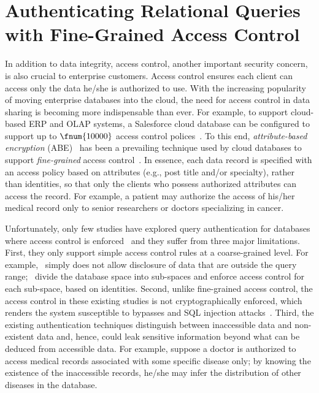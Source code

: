 \section{Authenticating Relational Queries with Fine-Grained Access Control}

In addition to data integrity, access control, another important security concern, is also crucial to enterprise customers. Access control ensures each client can access only the data he/she is authorized to use. With the increasing popularity of moving enterprise databases into the cloud, the need for access control in data sharing is becoming more indispensable than ever. For example, to support cloud-based ERP and OLAP systems, a Salesforce cloud database can be configured to support up to $\fnum{10000}$ access control polices~\cite{salesforce}. To this end, \emph{attribute-based encryption} (ABE)~\cite{10.1145/1180405.1180418,10.1109/sp.2007.11} has been a prevailing technique used by cloud databases to support \emph{fine-grained} access control~\cite{10.1145/2699026.2699101,10.1007/978-3-662-43936-4_21,10.1007/s10916-016-0588-0}. In essence, each data record is specified with an access policy based on attributes (e.g., post title and/or specialty), rather than identities, so that only the clients who possess authorized attributes can access the record. For example, a patient may authorize the access of his/her medical record only to senior researchers or doctors specializing in cancer.

Unfortunately, only few studies have explored query authentication for databases where access control is enforced~\cite{10.1007/978-3-540-88313-5_12,10.1007/978-3-642-39256-6_14,10.1145/1066157.1066204} and they suffer from three major limitations. First, they only support simple access control rules at a coarse-grained level. For example,~\cite{10.1145/1066157.1066204} simply does not allow disclosure of data that are outside the query range;~\cite{10.1007/978-3-540-88313-5_12,10.1007/978-3-642-39256-6_14} divide the database space into sub-spaces and enforce access control for each sub-space, based on identities. Second, unlike fine-grained access control, the access control in these existing studies is not cryptographically enforced, which renders the system susceptible to bypasses and SQL injection attacks~\cite{10.1145/2699026.2699101}. Third, the existing authentication techniques distinguish between inaccessible data and non-existent data and, hence, could leak sensitive information beyond what can be deduced from accessible data. For example, suppose a doctor is authorized to access medical records associated with some specific disease only; by knowing the existence of the inaccessible records, he/she may infer the distribution of other diseases in the database.

